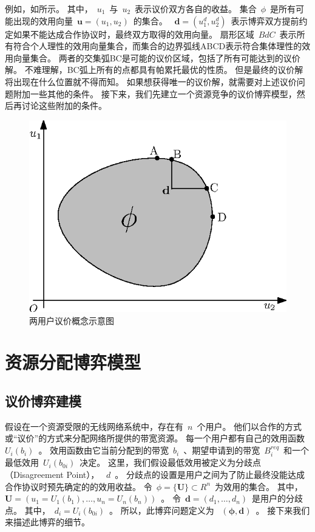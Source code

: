 例如，如所示。
其中，~$u_1$~与~$u_2$~表示议价双方各自的收益。
集合~$\phi$~是所有可能出现的效用向量~$\mathbf{u}=(u_1,u_2)$~的集合。
~$\mathbf{d}=(u_1^d, u_2^d)$~表示博弈双方提前约定如果不能达成合作协议时，最终双方取得的效用向量。
扇形区域~$BdC$~表示所有符合个人理性的效用向量集合，而集合的边界弧线ABCD表示符合集体理性的效用向量集合。
两者的交集弧BC是可能的议价区域，包括了所有可能达到的议价解。
不难理解，BC弧上所有的点都具有帕累托最优的性质。
但是最终的议价解将出现在什么位置就不得而知。
如果想获得唯一的议价解，就需要对上述议价问题附加一些其他的条件。
接下来，我们先建立一个资源竞争的议价博弈模型，然后再讨论这些附加的条件。
\begin{figure}[!tb] 
    \centering
   \begin{minipage}[t]{0.65\linewidth} 
    \centering 
    \includegraphics[width = \textwidth]{bargain_basic_concept} 
    \caption{两用户议价概念示意图} 
    \label{fig:chap_bargain:bargain_basic_concept} 
  \end{minipage}%
\end{figure}


\section{资源分配博弈模型}
\subsection{议价博弈建模}
假设在一个资源受限的无线网络系统中，存在有~$n$~个用户。
他们以合作的方式或“议价”的方式来分配网络所提供的带宽资源。
每一个用户都有自己的效用函数~$U_i(b_i)$~。
效用函数由它当前分配到的带宽~$b_i$~、期望申请到的带宽~$B_i^{req}$~和一个最低效用~$U_i(b_{0i})$~决定。
这里，我们假设最低效用被定义为分歧点（Disagreement Point）， ~$d$~。 
分歧点的设置是用户之间为了防止最终没能达成合作协议时预先确定的的效用收益。
令~$\phi = \{ \mathbf{U} \} \subset R^n$~为效用的集合。
其中，~$\mathbf{U} =( u_1 =U_1(b_1), \ldots, u_n = U_n(b_n))$~。
令~$\mathbf{d} = (d_1, \ldots, d_n)$~是用户的分歧点。
其中，~$d_i = U_i(b_{0i})$~。
所以，此博弈问题定义为 ~$(\mathbf{\phi,d})$~。
接下来我们来描述此博弈的细节。

